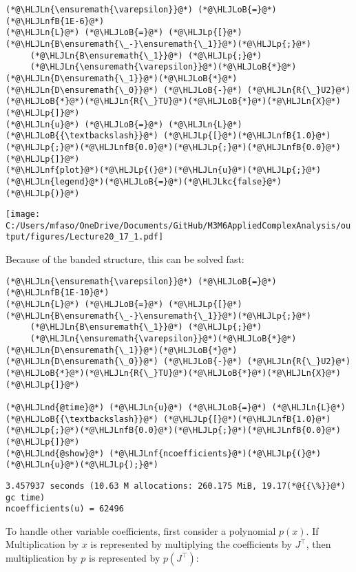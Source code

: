 \documentclass[12pt,landscape]{article}
\newcommand{\HLJLkc}[1]{\textcolor[RGB]{59,151,46}{\textit{#1}}}
\newcommand{\HLJLn}[1]{#1}
\newcommand{\HLJLnd}[1]{\textcolor[RGB]{214,102,97}{#1}}
\newcommand{\HLJLnf}[1]{\textcolor[RGB]{66,102,213}{#1}}
\newcommand{\HLJLnfB}[1]{\textcolor[RGB]{59,151,46}{#1}}
\newcommand{\HLJLoB}[1]{\textcolor[RGB]{102,102,102}{\textbf{#1}}}
\newcommand{\HLJLp}[1]{#1}
\def\cent#1{\begin{center}#1\end{center} }
\begin{document}
{\begin{lstlisting}
(*@\HLJLn{\ensuremath{\varepsilon}}@*) (*@\HLJLoB{=}@*) (*@\HLJLnfB{1E-6}@*)
(*@\HLJLn{L}@*) (*@\HLJLoB{=}@*) (*@\HLJLp{[}@*)(*@\HLJLn{B\ensuremath{\_-}\ensuremath{\_1}}@*)(*@\HLJLp{;}@*)
     (*@\HLJLn{B\ensuremath{\_1}}@*) (*@\HLJLp{;}@*)
     (*@\HLJLn{\ensuremath{\varepsilon}}@*)(*@\HLJLoB{*}@*)(*@\HLJLn{D\ensuremath{\_1}}@*)(*@\HLJLoB{*}@*)(*@\HLJLn{D\ensuremath{\_0}}@*) (*@\HLJLoB{-}@*) (*@\HLJLn{R{\_}U2}@*)(*@\HLJLoB{*}@*)(*@\HLJLn{R{\_}TU}@*)(*@\HLJLoB{*}@*)(*@\HLJLn{X}@*)(*@\HLJLp{]}@*)
(*@\HLJLn{u}@*) (*@\HLJLoB{=}@*) (*@\HLJLn{L}@*) (*@\HLJLoB{{\textbackslash}}@*) (*@\HLJLp{[}@*)(*@\HLJLnfB{1.0}@*)(*@\HLJLp{;}@*)(*@\HLJLnfB{0.0}@*)(*@\HLJLp{;}@*)(*@\HLJLnfB{0.0}@*)(*@\HLJLp{]}@*)
(*@\HLJLnf{plot}@*)(*@\HLJLp{(}@*)(*@\HLJLn{u}@*)(*@\HLJLp{;}@*) (*@\HLJLn{legend}@*)(*@\HLJLoB{=}@*)(*@\HLJLkc{false}@*)(*@\HLJLp{)}@*)
\end{lstlisting}
\cent{\texttt{[image: C:/Users/mfaso/OneDrive/Documents/GitHub/M3M6AppliedComplexAnalysis/output/figures/Lecture20\_17\_1.pdf]}}

Because of the banded structure, this can be solved fast:


\begin{lstlisting}
(*@\HLJLn{\ensuremath{\varepsilon}}@*) (*@\HLJLoB{=}@*) (*@\HLJLnfB{1E-10}@*)
(*@\HLJLn{L}@*) (*@\HLJLoB{=}@*) (*@\HLJLp{[}@*)(*@\HLJLn{B\ensuremath{\_-}\ensuremath{\_1}}@*)(*@\HLJLp{;}@*)
     (*@\HLJLn{B\ensuremath{\_1}}@*) (*@\HLJLp{;}@*)
     (*@\HLJLn{\ensuremath{\varepsilon}}@*)(*@\HLJLoB{*}@*)(*@\HLJLn{D\ensuremath{\_1}}@*)(*@\HLJLoB{*}@*)(*@\HLJLn{D\ensuremath{\_0}}@*) (*@\HLJLoB{-}@*) (*@\HLJLn{R{\_}U2}@*)(*@\HLJLoB{*}@*)(*@\HLJLn{R{\_}TU}@*)(*@\HLJLoB{*}@*)(*@\HLJLn{X}@*)(*@\HLJLp{]}@*)

(*@\HLJLnd{@time}@*) (*@\HLJLn{u}@*) (*@\HLJLoB{=}@*) (*@\HLJLn{L}@*) (*@\HLJLoB{{\textbackslash}}@*) (*@\HLJLp{[}@*)(*@\HLJLnfB{1.0}@*)(*@\HLJLp{;}@*)(*@\HLJLnfB{0.0}@*)(*@\HLJLp{;}@*)(*@\HLJLnfB{0.0}@*)(*@\HLJLp{]}@*)
(*@\HLJLnd{@show}@*) (*@\HLJLnf{ncoefficients}@*)(*@\HLJLp{(}@*)(*@\HLJLn{u}@*)(*@\HLJLp{);}@*)
\end{lstlisting}

\begin{lstlisting}
3.457937 seconds (10.63 M allocations: 260.175 MiB, 19.17(*@{{\%}}@*) gc time)
ncoefficients(u) = 62496
\end{lstlisting}


To handle other variable coefficients, first consider a polynomial $p(x)$. If Multiplication by $x$ is represented by multiplying the coefficients by $J^\top$, then multiplication by $p$ is represented by $p(J^\top)$:


}
\end{document}
